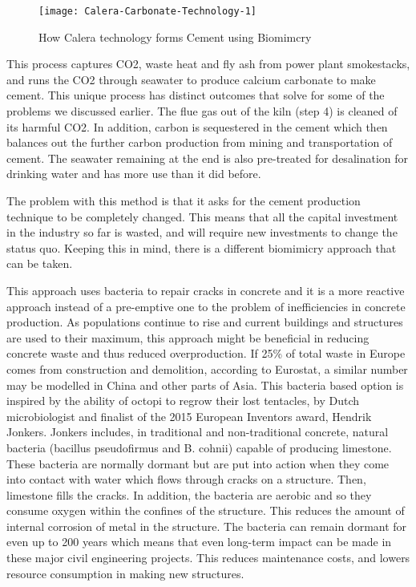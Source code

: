 \begin{figure}[h]
\texttt{[image: Calera-Carbonate-Technology-1]}
\caption{How Calera technology forms Cement using Biomimcry}
\label{fig:Calera-Carbonate-Technology-1}
\end{figure}

This process captures CO2, waste heat and fly ash from power plant smokestacks, and runs the CO2 through seawater to produce calcium carbonate to make cement. This unique process has distinct outcomes that solve for some of the problems we discussed earlier. The flue gas out of the kiln (step 4) is cleaned of its harmful CO2. In addition, carbon is sequestered in the cement which then balances out the further carbon production from mining and transportation of cement. The seawater remaining at the end is also pre-treated for desalination for drinking water and has more use than it did before.  

The problem with this method is that it asks for the cement production technique to be completely changed. This means that all the capital investment in the industry so far is wasted, and will require new investments to change the status quo. Keeping this in mind, there is a different biomimicry approach that can be taken.

This approach uses bacteria to repair cracks in concrete and it is a more reactive approach instead of a pre-emptive one to the problem of inefficiencies in concrete production.  As populations continue to rise and current buildings and structures are used to their maximum, this approach might be beneficial in reducing concrete waste and thus reduced overproduction. If 25\% of total waste in Europe comes from construction and demolition, according to Eurostat, a similar number may be modelled in China and other parts of Asia.  This bacteria based option is inspired by the ability of octopi to regrow their lost tentacles, by Dutch microbiologist and finalist of the 2015 European Inventors award, Hendrik Jonkers.
Jonkers includes, in traditional and non-traditional concrete, natural bacteria (bacillus pseudofirmus and B. cohnii) capable of producing limestone.  These bacteria are normally dormant but are put into action when they come into contact with water which flows through cracks on a structure. Then, limestone fills the cracks. In addition, the bacteria are aerobic and so they consume oxygen within the confines of the structure. This reduces the amount of internal corrosion of metal in the structure. The bacteria can remain dormant for even up to 200 years which means that even long-term impact can be made in these major civil engineering projects. This reduces maintenance costs, and lowers resource consumption in making new structures.

